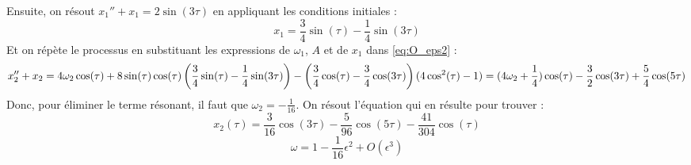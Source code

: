 Ensuite, on résout $x_1'' + x_1 = 2\sin(3\tau)$ en appliquant les conditions initiales :
\begin{equation}
    x_1 = \frac{3}{4}\sin(\tau) - \frac{1}{4}\sin(3\tau)
\end{equation}
%
Et on répète le processus en substituant les expressions de $\omega_1$, $A$ et de $x_1$ dans \eqref{eq:O_eps2} :
%
\begin{dmath}
    x_2'' + x_2 = 4\omega_2\cos(\tau) + 8\sin(\tau)\cos(\tau)\left(\frac{3}{4}\sin(\tau) - \frac{1}{4}\sin(3\tau)\right) - \left(\frac{3}{4}\cos(\tau) - \frac{3}{4}\cos(3\tau)\right)(4\cos^2(\tau)-1) \\
    = (4\omega_2 + \frac{1}{4})\cos(\tau) - \frac{3}{2}\cos(3\tau) + \frac{5}{4}\cos(5\tau)
\end{dmath}
%
Donc, pour éliminer le terme résonant, il faut que $\omega_2 = -\frac{1}{16}$. On résout l'équation qui en résulte pour trouver :
%
\begin{equation}
    x_2(\tau) = \frac{3}{16}\cos(3\tau) - \frac{5}{96}\cos(5\tau) - \frac{41}{304}\cos(\tau)
\end{equation}
%
\begin{equation}
    \omega = 1 - \frac{1}{16}\epsilon^2 + O(\epsilon^3)
\end{equation}
%
